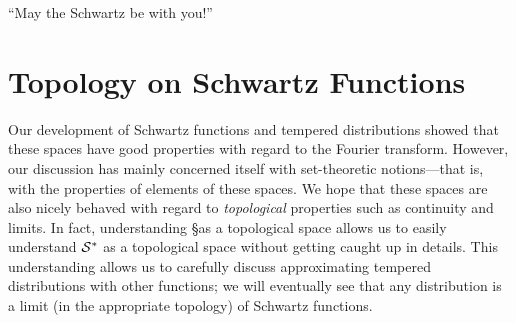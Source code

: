 
  \setcounter{chapter}{1}
  \begin{savequote}
    ``May the Schwartz be with you!''
  \end{savequote}
  \chapter{Topology on Schwartz Functions}
    \label{ch:topons}
    Our development of Schwartz functions and tempered distributions showed that these spaces have good properties with regard to the Fourier transform.
    However, our discussion has mainly concerned itself with set-theoretic notions---that is, with the properties of elements of these spaces.
    We hope that these spaces are also nicely behaved with regard to \emph{topological} properties such as continuity and limits.
    In fact, understanding \S as a topological space allows us to easily understand $\mathcal{S}^*$ as a topological space without getting caught up in details.
    This understanding allows us to carefully discuss approximating tempered distributions with other functions; we will eventually see that any distribution is a limit (in the appropriate topology) of Schwartz functions.


